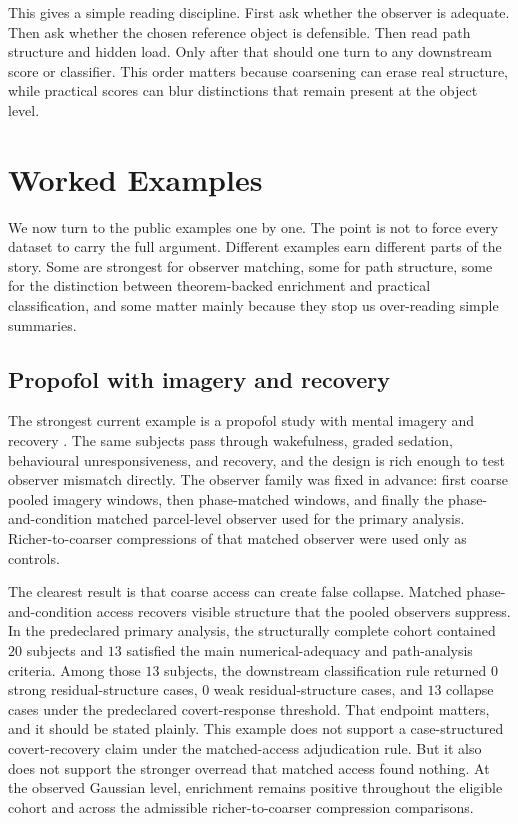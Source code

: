 \documentclass[11pt,a4paper]{article}
\numberwithin{equation}{section}
\theoremstyle{thmcompact}
\theoremstyle{remark}
\begin{document}
This gives a simple reading discipline. First ask whether the observer is adequate. Then ask whether the chosen reference object is defensible. Then read path structure and hidden load. Only after that should one turn to any downstream score or classifier. This order matters because coarsening can erase real structure, while practical scores can blur distinctions that remain present at the object level.

\section{Worked Examples}
\label{sec:worked-examples}

We now turn to the public examples one by one. The point is not to force every dataset to carry the full argument. Different examples earn different parts of the story. Some are strongest for observer matching, some for path structure, some for the distinction between theorem-backed enrichment and practical classification, and some matter mainly because they stop us over-reading simple summaries.

\subsection{Propofol with imagery and recovery}

The strongest current example is a propofol study with mental imagery and recovery \cite{openneuro_ds006623,huang2026open}. The same subjects pass through wakefulness, graded sedation, behavioural unresponsiveness, and recovery, and the design is rich enough to test observer mismatch directly. The observer family was fixed in advance: first coarse pooled imagery windows, then phase-matched windows, and finally the phase-and-condition matched parcel-level observer used for the primary analysis. Richer-to-coarser compressions of that matched observer were used only as controls.

The clearest result is that coarse access can create false collapse. Matched phase-and-condition access recovers visible structure that the pooled observers suppress. In the predeclared primary analysis, the structurally complete cohort contained \(20\) subjects and \(13\) satisfied the main numerical-adequacy and path-analysis criteria. Among those \(13\) subjects, the downstream classification rule returned \(0\) strong residual-structure cases, \(0\) weak residual-structure cases, and \(13\) collapse cases under the predeclared covert-response threshold. That endpoint matters, and it should be stated plainly. This example does not support a case-structured covert-recovery claim under the matched-access adjudication rule. But it also does not support the stronger overread that matched access found nothing. At the observed Gaussian level, enrichment remains positive throughout the eligible cohort and across the admissible richer-to-coarser compression comparisons.
\end{document}
